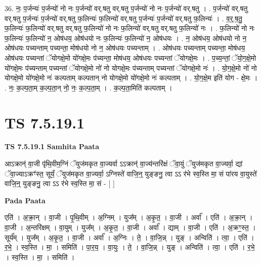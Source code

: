 \documentclass[17pt]{extarticle}
\begin{document}
36. नः॒ प॒र्जन्यः॑ प॒र्जन्यो॑ नो नः प॒र्जन्यो॑ वर्.षतु वर्.षतु प॒र्जन्यो॑ नो नः प॒र्जन्यो॑ वर्.षतु । . प॒र्जन्यो॑ वर्.षतु वर्.षतु प॒र्जन्यः॑ प॒र्जन्यो॑ वर्.षतु फ॒लिन्यः॑ फ॒लिन्यो॑ वर्.षतु प॒र्जन्यः॑ प॒र्जन्यो॑ वर्.षतु फ॒लिन्यः॑ । . व॒र्॒.ष॒तु॒ फ॒लिन्यः॑ फ॒लिन्यो॑ वर्.षतु वर्.षतु फ॒लिन्यो॑ नो नः फ॒लिन्यो॑ वर्.षतु वर्.षतु फ॒लिन्यो॑ नः । . फ॒लिन्यो॑ नो नः फ॒लिन्यः॑ फ॒लिन्यो॑ न॒ ओष॑धय॒ ओष॑धयो नः फ॒लिन्यः॑ फ॒लिन्यो॑ न॒ ओष॑धयः । . न॒ ओष॑धय॒ ओष॑धयो नो न॒ ओष॑धयः पच्यन्ताम् पच्यन्ता॒ मोष॑धयो नो न॒ ओष॑धयः पच्यन्ताम् । . ओष॑धयः पच्यन्ताम् पच्यन्ता॒ मोष॑धय॒ ओष॑धयः पच्यन्तां ॅयोगक्षे॒मो यो॑गक्षे॒मः प॑च्यन्ता॒ मोष॑धय॒ ओष॑धयः पच्यन्तां ॅयोगक्षे॒मः । . प॒च्य॒न्तां॒ ॅयो॒ग॒क्षे॒मो यो॑गक्षे॒मः प॑च्यन्ताम् पच्यन्तां ॅयोगक्षे॒मो नो॑ नो योगक्षे॒मः प॑च्यन्ताम् पच्यन्तां ॅयोगक्षे॒मो नः॑ । . यो॒ग॒क्षे॒मो नो॑ नो योगक्षे॒मो यो॑गक्षे॒मो नः॑ कल्पताम् कल्पतान् नो योगक्षे॒मो यो॑गक्षे॒मो नः॑ कल्पताम् । . यो॒ग॒क्षे॒म इति॑ योग - क्षे॒मः । . नः॒ क॒ल्प॒ता॒म् क॒ल्प॒ता॒न् नो॒ नः॒ क॒ल्प॒ता॒म् । . क॒ल्प॒ता॒मिति॑ कल्पताम् । \newline
\pagebreak
{}

\section{ TS 7.5.19.1 }

\textbf{TS 7.5.19.1 } \newline
\textbf{Samhita Paata} \newline

आऽक्रान्॑ वा॒जी पृ॑थि॒वीम॒ग्निं ॅयुज॑मकृत वा॒ज्यर्वा ऽऽक्रान्॑ वा॒ज्य॑न्तरि॑क्षं ॅवा॒युं ॅयुज॑मकृत वा॒ज्यर्वा॒ द्यां ॅवा॒ज्याऽक्रꣳ॑स्त॒ सूर्यं॒ ॅयुज॑मकृत वा॒ज्यर्वा॒ ऽग्निस्ते॑ वाजि॒न्॒ युङ्ङनु॒ त्वा ऽऽ र॑भे स्व॒स्ति मा॒ सं पा॑रय वा॒युस्ते॑ वाजि॒न्॒ युङ्ङनु॒ त्वा ऽऽ र॑भे स्व॒स्ति मा॒ सं - [  ] \newline

\textbf{Pada Paata} \newline

एति॑ । अ॒क्रा॒न् । वा॒जी । पृ॒थि॒वीम् । अ॒ग्निम् । युज᳚म् । अ॒कृ॒त॒ । वा॒जी । अर्वा᳚ । एति॑ । अ॒क्रा॒न् । वा॒जी । अ॒न्तरि॑क्षम् । वा॒युम् । युज᳚म् । अ॒कृ॒त॒ । वा॒जी । अर्वा᳚ । द्याम् । वा॒जी । एति॑ । अ॒क्रꣳ॒॒स्त॒ । सूर्य᳚म् । युज᳚म् । अ॒कृ॒त॒ । वा॒जी । अर्वा᳚ । अ॒ग्निः । ते॒ । वा॒जि॒न्न् । युङ् । अन्विति॑ । त्वा॒ । एति॑ । र॒भे॒ । स्व॒स्ति । मा॒ । समिति॑ । पा॒र॒य॒ । वा॒युः । ते॒ । वा॒जि॒न्न् । युङ् । अन्विति॑ । त्वा॒ । एति॑ । र॒भे॒ । स्व॒स्ति । मा॒ । समिति॑ ।  \newline
\end{document}

